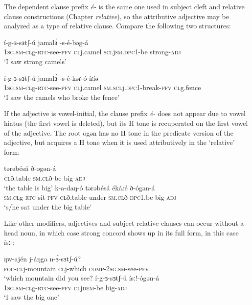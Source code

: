 The dependent clause prefix \textit{é-} is the same one used in subject cleft and relative clause constructions (Chapter \textit{relative}), so the attributive adjective may be analyzed as a type of relative clause. Compare the following two structures:

\ea %
	\ea \gll	í-g-ɜ-sɜtʃ-ú 	jamalɜ́ 	-s-é-bəg-á \\
				1\textsc{sg}.\textsc{sm}-\textsc{cl}g-\textsc{rtc}-see-\textsc{pfv}  	\textsc{cl}j.camel	\textsc{scl}j\textsc{sm}.\textsc{dpc}1-be strong-\textsc{adj}\\
		\glt ‘I saw strong camels’

	\ex \gll 	í-g-ɜ-sɜtʃ-ú 	jamalɜ́ 	-s-é-kəɾ-ó 	íɾíə\\
			1\textsc{sg}.\textsc{sm}-\textsc{cl}g-\textsc{rtc}-see-\textsc{pfv}  	\textsc{cl}j.camel	\textsc{sm}.\textsc{scl}j.\textsc{dpc}1-break-\textsc{pfv} \textsc{cl}g.fence\\
		\glt 	‘I saw the camels who broke the fence’
	\z
\z

If the adjective is vowel-initial, the clause prefix \textit{é-} does not appear due to vowel hiatus (the first vowel is deleted), but its H tone is recuperated on the first vowel of the adjective. The root ogən has no H tone in the predicate version of the adjective, but acquires a H tone when it is used attributively in the ‘relative’ form:

\ea %
	\ea \gll	tərəbésá 	ð-ogən-á	\\
	\textsc{cl}ð.table 	\textsc{sm}.\textsc{cl}ð-be big-\textsc{adj}	\\
		\glt	‘the table is big’
	\ex \gll	k-a-daŋ-ó 	tərəbésá 	ékáɾé 	ð-ógən-á \\
			\textsc{sm}.\textsc{cl}g-\textsc{rtc}-sit-\textsc{pfv}	\textsc{cl}ð.table 	under	\textsc{sm}.\textsc{cl}ð-\textsc{dpc}1.be big-\textsc{adj}\\	
		\glt	‘s/he sat under the big table’	
	\z
\z

Like other modifiers, adjectives and subject relative clauses can occur without a head noun, in which case strong concord shows up in its full form, in this case ísː-:

\ea 
	\ea \gll	ŋw-ajén 	j-áŋga 	n-ɜ́-sɜtʃ-ú?\\
\textsc{foc}-\textsc{cl}j-mountain	\textsc{cl}j-which	\textsc{comp}-2\textsc{sg}.\textsc{sm}-see-\textsc{pfv}\\
		\glt		‘which mountain did you see?
	\ex	\gll 	í-g-ɜ-sɜtʃ-ú 	ísː!-ógən-á\\
	1\textsc{sg}.\textsc{sm}-\textsc{cl}g-\textsc{rtc}-see-\textsc{pfv}	\textsc{cl}j\textsc{dem}-be big-\textsc{adj}	\\
		\glt		‘I saw the big one’
	\z
\z

